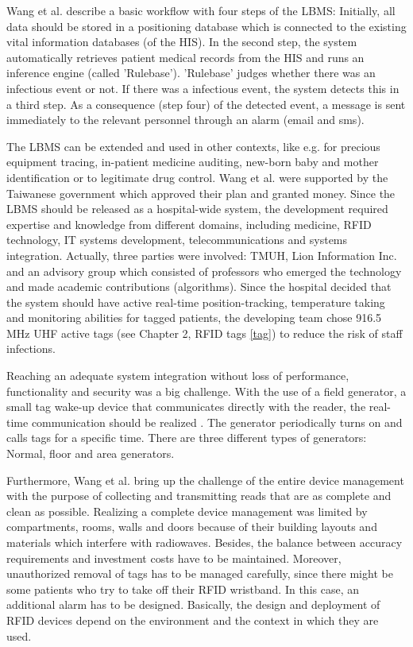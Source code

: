 Wang et al. describe a basic workflow with four steps of the LBMS: Initially, all data should be stored in a positioning database which is connected to the existing vital information databases (of the HIS). In the second step, the system automatically retrieves patient medical records from the HIS and runs an inference engine (called 'Rulebase').  'Rulebase' judges whether there was an infectious event or not. If there was a infectious event, the system detects this in a third step. As a consequence (step four) of the detected event, a message is sent immediately to the relevant personnel through an alarm (email and sms). 

The LBMS can be extended and used in other contexts, like e.g. for precious equipment tracing, in-patient medicine auditing, new-born baby and mother identification or to legitimate drug control.
Wang et al. were supported by the Taiwanese government which approved their plan and granted money. Since the LBMS should be released as a hospital-wide system, the development required expertise and knowledge from different domains, including medicine, RFID technology, IT systems development, telecommunications and systems integration. Actually, three parties were involved: TMUH, Lion Information Inc. and an advisory group \cite[p.4]{casestudy} which consisted of professors who emerged the technology and made academic contributions (algorithms).
Since the hospital decided that the system should have active real-time position-tracking, temperature taking and monitoring abilities for tagged patients, the developing team chose 916.5 MHz UHF active tags (see Chapter 2, RFID tags \ref{tag}) to reduce the risk of staff infections.

Reaching an adequate system integration without loss of performance, functionality and security was a big challenge. With the use of a field generator, a small tag wake-up device that communicates directly with the reader, the real-time communication should be realized \cite[p.4]{casestudy}. The generator periodically turns on and calls tags for a specific time. There are three different types of generators: Normal, floor and area generators.

Furthermore, Wang et al. bring up the challenge of the entire device management \cite[p.5]{casestudy} with the purpose of collecting and transmitting reads that are as complete and clean as possible. Realizing a complete device management was limited by compartments, rooms, walls and doors because of their building layouts and materials which interfere with radiowaves. Besides, the balance between accuracy requirements and investment costs have to be maintained. Moreover, unauthorized removal of tags has to be managed carefully, since there might be some patients who try to take off their RFID wristband. In this case, an additional alarm has to be designed. Basically, the design and deployment of RFID devices depend on the environment and the context in which they are used. 

